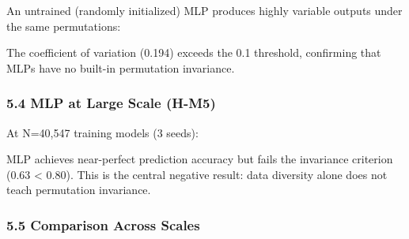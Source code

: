 An untrained (randomly initialized) MLP produces highly variable outputs under the same permutations:

\begin{table}[htbp]
\centering
{}
\end{table}

The coefficient of variation (0.194) exceeds the 0.1 threshold, confirming that MLPs have no built-in permutation invariance.

\subsubsection{5.4 MLP at Large Scale (H-M5)}

At N=40,547 training models (3 seeds):

\begin{table}[htbp]
\centering
{}
\end{table}

MLP achieves near-perfect prediction accuracy but fails the invariance criterion (0.63 < 0.80). This is the central negative result: data diversity alone does not teach permutation invariance.

\subsubsection{5.5 Comparison Across Scales}

\begin{table}[htbp]
\centering
{}
\end{table}

